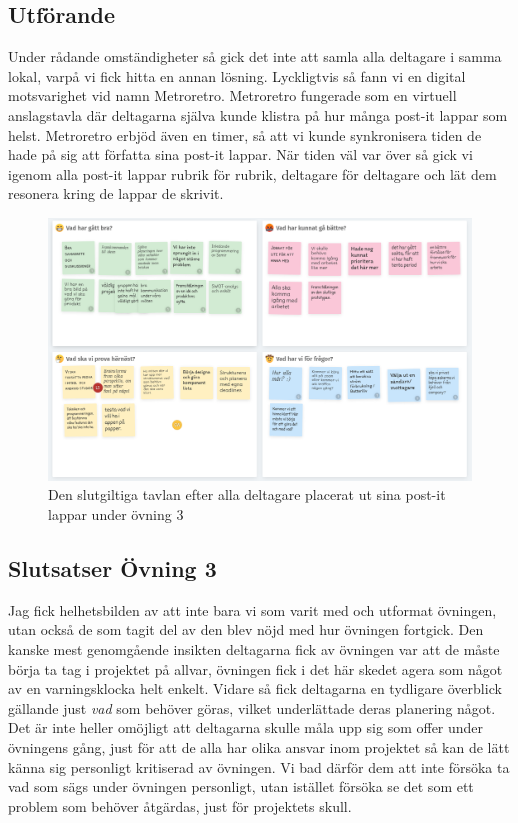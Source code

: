 \documentclass[a4paper, titlepage,12pt]{article}
\begin{document}
			\subsection{Utförande}
				
				Under rådande omständigheter så gick det inte att samla alla deltagare i samma lokal, varpå vi fick hitta en annan lösning. Lyckligtvis så fann vi en digital motsvarighet vid namn Metroretro. Metroretro fungerade som en virtuell anslagstavla där deltagarna själva kunde klistra på hur många post-it lappar som helst. Metroretro erbjöd även en timer, så att vi kunde synkronisera tiden de hade på sig att författa sina post-it lappar.\cite{metroretro} När tiden väl var över så gick vi igenom alla post-it lappar rubrik för rubrik, deltagare för deltagare och lät dem resonera kring de lappar de skrivit.

				\begin{figure}[h!]
					\includegraphics[scale=0.35]{./metroretro-1.png}
					\caption{Den slutgiltiga tavlan efter alla deltagare placerat ut sina post-it lappar under övning 3}
				\end{figure}

			\subsection{Slutsatser Övning 3}

				Jag fick helhetsbilden av att inte bara vi som varit med och utformat övningen, utan också de som tagit del av den blev nöjd med hur övningen fortgick. Den kanske mest genomgående insikten deltagarna fick av övningen var att de måste börja ta tag i projektet på allvar, övningen fick i det här skedet agera som något av en varningsklocka helt enkelt. Vidare så fick deltagarna en tydligare överblick gällande just \emph{vad} som behöver göras, vilket underlättade deras planering något. Det är inte heller omöjligt att deltagarna skulle måla upp sig som offer under övningens gång, just för att de alla har olika ansvar inom projektet så kan de lätt känna sig personligt kritiserad av övningen. Vi bad därför dem att inte försöka ta vad som sägs under övningen personligt, utan istället försöka se det som ett problem som behöver åtgärdas, just för projektets skull.
\end{document}
